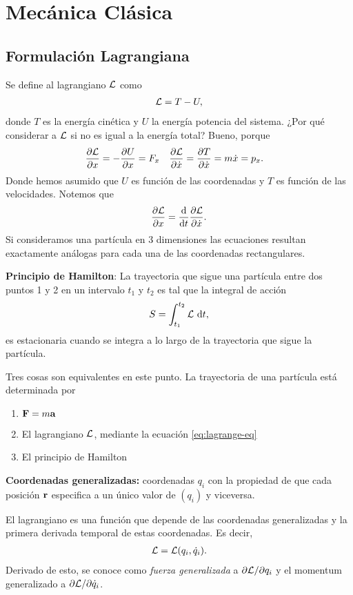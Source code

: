 \chapter{Mecánica Clásica}

\section{Formulación Lagrangiana}
Se define al lagrangiano $\mathcal{L}$ como 
\begin{align}
\mathcal{L} = T-U
\label{eq:lagrangian},
\end{align}
donde $T$ es la energía cinética y $U$ la energía potencia del sistema.
¿Por qué considerar a $\mathcal{L}$ si no es igual a la energía total?
Bueno, porque
\begin{align}
\pdv{\mathcal{L}}{x}=-\pdv{U}{x}&=F_x &
\pdv{\mathcal{L}}{\dot{x}}=\pdv{T}{\dot{x}}=m\dot{x	}&=p_x.
\end{align}
Donde hemos asumido que $U$ es función de las coordenadas y 
$T$ es función de las velocidades. Notemos que 
\begin{align}
\pdv{\mathcal{L}}{x}=\dv{t}\pdv{\mathcal{L}}{\dot{x}}.
\label{eq:lagrange-eq}
\end{align}
Si consideramos una partícula en 3 dimensiones las ecuaciones 
resultan exactamente análogas para cada una de las coordenadas 
rectangulares.

\textbf{Principio de Hamilton}: La trayectoria que sigue una partícula 
entre dos puntos 1 y 2 en un intervalo $t_1$ y $t_2$ es tal 
que la integral de acción 
\begin{align}
S=\int_{t_1}^{t_2} \mathcal{L} \ \mathrm{d} t,
\end{align}
es estacionaria cuando se integra a lo largo de la trayectoria que sigue 
la partícula. 

Tres cosas son equivalentes en este punto. La trayectoria de una partícula
está determinada por 
\begin{enumerate}
\item $\vb{F}=m\vb{a}$
\item El lagrangiano $\mathcal{L}$, mediante la ecuación \eqref{eq:lagrange-eq}
\item El principio de Hamilton
\end{enumerate}

\textbf{Coordenadas generalizadas:} coordenadas $q_i$ con la propiedad
de que cada posición $\vb{r}$ especifica a un único valor de $(q_i)$ y 
viceversa.

El lagrangiano es una función que depende de las coordenadas 
generalizadas y la primera derivada temporal de estas coordenadas. Es 
decir, 
\begin{align}
\mathcal{L} = \mathcal{L} \qty(q_i,\dot{q}_i).
\end{align}
Derivado de esto, se conoce como \textit{fuerza generalizada} a 
$\partial \mathcal{L} /\partial q_i$ y el momentum generalizado a 
$\partial \mathcal{L} /\partial \dot{q}_i$.


